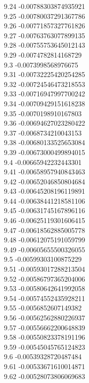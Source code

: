 {9.24	-0.00788303874935921\\
9.25	-0.00780037291367786\\
9.26	-0.00771857327761826\\
9.27	-0.00763763077899135\\
9.28	-0.00755753645012143\\
9.29	-0.0074782814168729\\
9.3	-0.0073998568976675\\
9.31	-0.00732225420254285\\
9.32	-0.00724546473218553\\
9.33	-0.00716947997700242\\
9.34	-0.00709429151618238\\
9.35	-0.0070198910167803\\
9.36	-0.00694627023280422\\
9.37	-0.0068734210043153\\
9.38	-0.00680133525653084\\
9.39	-0.00673000499894015\\
9.4	-0.00665942232443301\\
9.41	-0.00658957940843463\\
9.42	-0.00652046850804684\\
9.43	-0.00645208196119891\\
9.44	-0.00638441218581106\\
9.45	-0.00631745167896116\\
9.46	-0.00625119301606415\\
9.47	-0.00618562885005778\\
9.48	-0.00612075191059799\\
9.49	-0.00605655500326055\\
9.5	-0.00599303100875229\\
9.51	-0.00593017288213504\\
9.52	-0.00586797365204006\\
9.53	-0.00580642641992058\\
9.54	-0.00574552435928211\\
9.55	-0.0056852607149382\\
9.56	-0.00562562880226937\\
9.57	-0.00556662200648839\\
9.58	-0.00550823378191196\\
9.59	-0.00545045765124823\\
9.6	-0.00539328720487484\\
9.61	-0.00533671610014871\\
9.62	-0.00528073806069683\\
}
